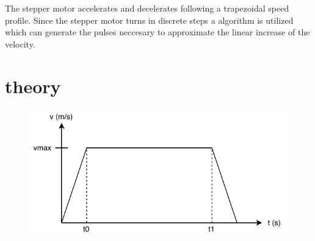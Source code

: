 \documentclass{article}
\begin{document}
   The stepper motor accelerates and decelerates following a trapezoidal speed profile. Since the stepper motor turns in discrete steps  a algorithm is utilized 
   which can generate the pulses neccesary to approximate the linear increase of the velocity.

   \section{theory}
   \begin{figure}
        \includegraphics[width=\linewidth]{graph.pdf}
   \end{figure}
    
\end{document}
